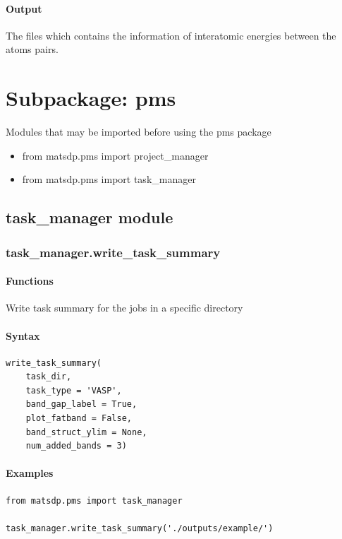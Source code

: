 \documentclass[12pt]{book}
\begin{document}
\subsubsection{Output}

The files which contains the information of interatomic energies between the atoms pairs.

\chapter{Subpackage: pms}

Modules that may be imported before using the pms package
\begin{itemize}
\item from matsdp.pms import project\_manager
\item from matsdp.pms import task\_manager
\end{itemize}

\section{task\_manager module}

\subsection{task\_manager.write\_task\_summary}
\subsubsection{Functions}
Write task summary for the jobs in a specific directory
\subsubsection{Syntax}
\begin{lstlisting}
write_task_summary(
    task_dir, 
    task_type = 'VASP', 
    band_gap_label = True, 
    plot_fatband = False, 
    band_struct_ylim = None, 
    num_added_bands = 3)
\end{lstlisting}
\subsubsection{Examples}
\begin{lstlisting}
from matsdp.pms import task_manager

task_manager.write_task_summary('./outputs/example/')
\end{lstlisting}
\end{document}

